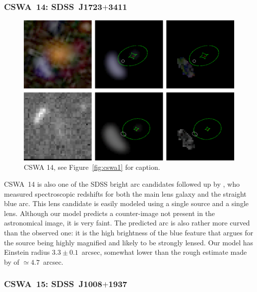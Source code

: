 \documentclass[iop]{emulateapj}
\begin{document}

\subsubsection*{CSWA~14: SDSS\ J1723$+$3411}
\label{sec:results:indinotes:cswa14}


\begin{figure}[!ht]
	\centering\includegraphics[width=\linewidth]{figs/14.eps}
	\caption{CSWA 14, see Figure~\ref{fig:cswa1} for caption.}
	\label{fig:cswa14}
\end{figure}

CSWA~14 is also one of the SDSS bright arc candidates followed up by
\citet{Kub++10}, who measured spectroscopic redshifts for both the main lens
galaxy and the straight blue arc. This lens candidate is easily modeled using a
single source and a single lens. Although our model predicts a counter-image not
present in the astronomical image, it is very faint. The predicted arc is also
rather more curved than the observed one: it is the high brightness of the blue
feature that argues for the source being highly magnified and likely to be
strongly lensed. Our model has Einstein radius $3.3\pm0.1$~arcsec, somewhat
lower than the rough estimate made by \citet{Kub++10} of $\simeq 4.7$~arcsec.



\subsubsection*{CSWA~15: SDSS\ J1008$+$1937}
\label{sec:results:indinotes:cswa15}
\end{document}
